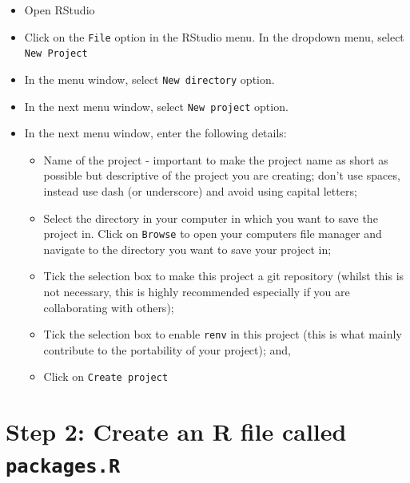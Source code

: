 \documentclass[
  12pt,
]{book}
\begin{document}
\begin{itemize}
\item
  Open RStudio
\item
  Click on the \texttt{File} option in the RStudio menu. In the dropdown menu, select \texttt{New\ Project}
\item
  In the menu window, select \texttt{New\ directory} option.
\item
  In the next menu window, select \texttt{New\ project} option.
\item
  In the next menu window, enter the following details:

  \begin{itemize}
  \item
    Name of the project - important to make the project name as short as possible but descriptive of the project you are creating; don't use spaces, instead use dash (or underscore) and avoid using capital letters;
  \item
    Select the directory in your computer in which you want to save the project in. Click on \texttt{Browse} to open your computers file manager and navigate to the directory you want to save your project in;
  \item
    Tick the selection box to make this project a git repository (whilst this is not necessary, this is highly recommended especially if you are collaborating with others);
  \item
    Tick the selection box to enable \texttt{renv} in this project (this is what mainly contribute to the portability of your project); and,
  \item
    Click on \texttt{Create\ project}
  \end{itemize}
\end{itemize}

\hypertarget{step-2-create-an-r-file-called-packages.r}{%
\section{\texorpdfstring{Step 2: Create an R file called \texttt{packages.R}}{Step 2: Create an R file called packages.R}}\label{step-2-create-an-r-file-called-packages.r}}
\end{document}
